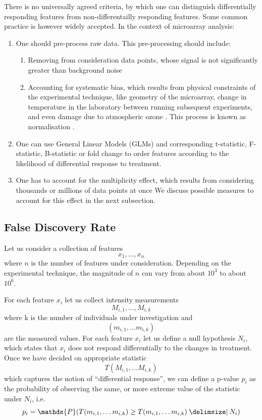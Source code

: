 There is no universally agreed criteria, by which one can distinguish differentially responding features from non-differentailly responding features. Some common practice is however widely accepted. In the context of microarray analysis:
\begin{enumerate}
    \item One should pre-process raw data. This pre-processing should include:
    \begin{enumerate}
        \item Removing from consideration data points, whose signal is not significantly greater than background noise \parencite{Smyth2004}
        \item Accounting for systematic bias, which results from physical constraints of the experimental technique, like geometry of the microarray, change in temperature in the laboratory between running subsequent experiments, and even damage due to atmospheric ozone \parencite{Fare2003}. This process is known as normalisation \parencite{Wit2004}.
    \end{enumerate}
    \item One can use General Linear Models (GLMs) and corresponding t-statistic, F-statistic, B-statistic or fold change to order features according to the likelihood of differential response to treatment. \parencite{Smyth2004}
    \item One has to account for the multiplicity effect, which results from considering thousands or millions of data points at once \parencite{Wit2004} We discuss possible measures to account for this effect in the next subsection.
\end{enumerate}

\subsection{False Discovery Rate} \label{FDR}

Let us consider a collection of features $$x_{1}, \ldots, x_{n}$$ where $n$ is the number of features under consideration. Depending on the experimental technique, the magnitude of $n$ can vary from about $10^{3}$ to about $10^{6}$.

For each feature $x_{i}$ let us collect intensity measurements $$M_{i,1}, \ldots, M_{i,k}$$ where k is the number of individuals under investigation and $$(m_{i,1}, \ldots m_{i,k})$$ are the measured values. For each feature $x_{i}$ let us define a null hypothesis $N_{i}$, which states that $x_{i}$ does not respond differentially to the changes in treatment. Once we have decided on appropriate statistic $$T(M_{i,1}, \ldots M_{i,k})$$ which captures the notion of ``differential response'', we can define a p-value $p_{i}$ as the probability of observing the same, or more extreme value of the statistic under $N_{i}$, i.e.  $$p_{i}=\mathds{P}(T(m_{i,1}, \ldots m_{i,k}) \geq T(m_{i,1}, \ldots m_{i,k}) \given N_{i})$$

